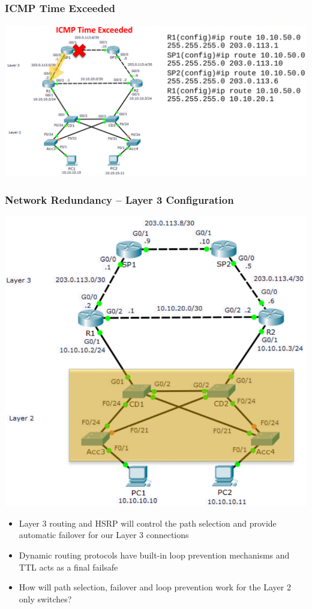 \documentclass[pdflatex,compress,mathserif]{beamer}
\begin{document}
\begin{frame}
	\frametitle{ICMP Time Exceeded}
	\begin{center}
		\includegraphics[width=\linewidth]{img/img22}
	\end{center}
\end{frame}

\begin{frame}
	\frametitle{Network Redundancy – Layer 3 Configuration}
	\begin{multicols}{2}
		\begin{center}
			\includegraphics[width=\linewidth]{img/img23}
		\end{center}
		\columnbreak
		\begin{itemize}
			\item Layer 3 routing and HSRP will
control the path selection and
provide automatic failover for our
Layer 3 connections
			\item Dynamic routing protocols have
built-in loop prevention
mechanisms and TTL acts as a final
failsafe
			\item How will path selection, failover and
loop prevention work for the Layer 2
only switches?
		\end{itemize}
	\end{multicols}
\end{frame}
\end{document}
